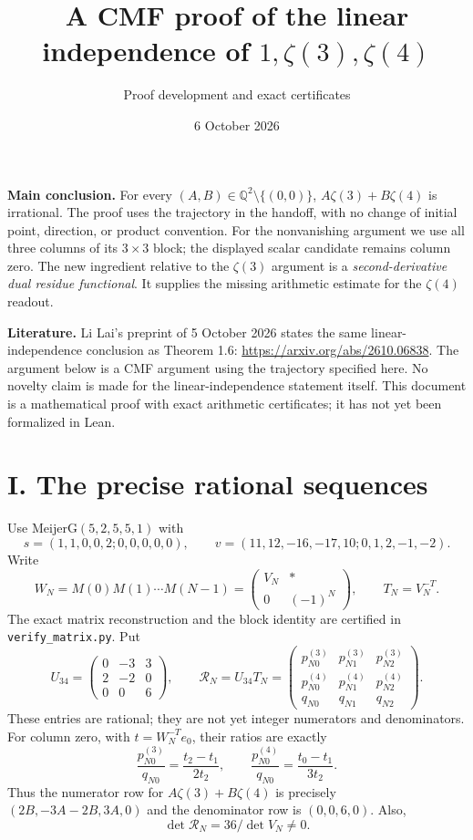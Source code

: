 \documentclass[11pt]{article}
\title{A CMF proof of the linear independence of $1,\zeta(3),\zeta(4)$}
\author{Proof development and exact certificates}
\date{6 October 2026}
\newcommand{\Q}{\mathbb Q}
\begin{document}
\maketitle

\noindent\textbf{Main conclusion.} For every $(A,B)\in\Q^2\setminus\{(0,0)\}$,
$A\zeta(3)+B\zeta(4)$ is irrational. The proof uses the trajectory in the
handoff, with no change of initial point, direction, or product convention.
For the nonvanishing argument we use all three columns of its $3\times3$
block; the displayed scalar candidate remains column zero.
The new ingredient relative to the $\zeta(3)$ argument is a
\emph{second-derivative dual residue functional}. It supplies the missing
arithmetic estimate for the $\zeta(4)$ readout.

\medskip
\noindent\textbf{Literature.} Li Lai's preprint of 5 October 2026 states the
same linear-independence conclusion as Theorem 1.6:
\url{https://arxiv.org/abs/2610.06838}. The argument below is a CMF argument
using the trajectory specified here. No novelty claim is made for the
linear-independence statement itself. This document is a mathematical proof
with exact arithmetic certificates; it has not yet been formalized in Lean.

\section*{I. The precise rational sequences}
Use $\mathrm{MeijerG}(5,2,5,5,1)$ with
\[
 s=(1,1,0,0,2;0,0,0,0,0),\qquad
 v=(11,12,-16,-17,10;0,1,2,-1,-2).
\]
Write
\[
 W_N=M(0)M(1)\cdots M(N-1)
 =\begin{pmatrix}V_N&*\\0&(-1)^N\end{pmatrix},\qquad T_N=V_N^{-T}.
\]
The exact matrix reconstruction and the block identity are certified in
\texttt{verify\_matrix.py}. Put
\[
 U_{34}=\begin{pmatrix}0&-3&3\\2&-2&0\\0&0&6\end{pmatrix},\qquad
 \mathcal R_N=U_{34}T_N
 =\begin{pmatrix}p^{(3)}_{N0}&p^{(3)}_{N1}&p^{(3)}_{N2}\\
 p^{(4)}_{N0}&p^{(4)}_{N1}&p^{(4)}_{N2}\\q_{N0}&q_{N1}&q_{N2}\end{pmatrix}.
\]
These entries are rational; they are not yet integer numerators and denominators.
For column zero, with $t=W_N^{-T}e_0$, their ratios are exactly
\[
 \frac{p^{(3)}_{N0}}{q_{N0}}=\frac{t_2-t_1}{2t_2},\qquad
 \frac{p^{(4)}_{N0}}{q_{N0}}=\frac{t_0-t_1}{3t_2}.
\]
Thus the numerator row for $A\zeta(3)+B\zeta(4)$ is precisely
$(2B,-3A-2B,3A,0)$ and the denominator row is $(0,0,6,0)$.
Also,
\begin{equation}\label{new:det}
 \det\mathcal R_N=36/\det V_N\ne0.
\end{equation}
\end{document}
